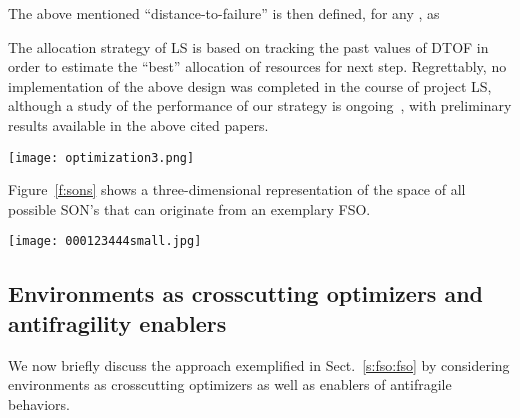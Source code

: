 \documentclass[twocolumn]{svjour3}
\begin{document}
The above mentioned ``distance-to-failure'' is then defined, for any , as 

The allocation strategy of LS is based on tracking the past values of DTOF in order to estimate the ``best''
allocation of resources for next step. Regrettably, no implementation of the above design was completed
in the course of project LS, although a study of the performance of our strategy
is ongoing~\cite{Buys15}, with preliminary results available in the above cited papers.


\begin{figure*}
\centerline{\texttt{[image: optimization3.png]}}
\caption{LS optimization is based on measuring resource overshooting (function ) and
undershooting (function ) and adjusting resource allocation accordingly. The picture
shows the three possible system states: in  the system experiences resource undershooting; 
in , resource overshooting; and in  it reaches an optimal resource expenditure.}
\label{f:opt}
\end{figure*}


Figure~\ref{f:sons} shows a three-dimensional representation of the space of all possible SON's that can
originate from an exemplary FSO.

\begin{figure*}
\centerline{\texttt{[image: 000123444small.jpg]}}
\caption{The graph represents the set of all the
social overlay networks that may emerge from an FSO with 9 nodes and 5 roles (roles 0--4).
   In this case the FSO consists of three nodes able to play role 0; three nodes able to play respectively roles 1--3;
   and three roles able to play role 4.
   The graph was produced with the POV-Ray ray tracing program~\cite{povray}.}
\label{f:sons}
\end{figure*}



\subsection{Environments as crosscutting optimizers and antifragility enablers}
We now briefly discuss the approach exemplified in Sect.~\ref{s:fso:fso} by considering
environments as crosscutting optimizers as well as enablers of antifragile behaviors.
\end{document}
